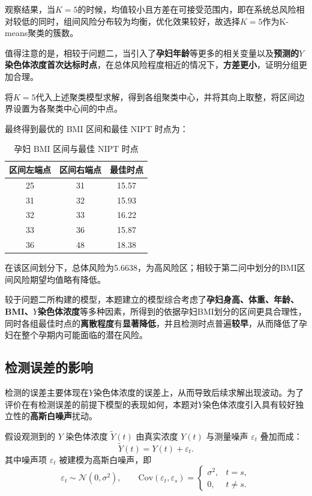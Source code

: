 \documentclass[12pt]{ctexart}
\begin{document}
	观察结果，当$K=5$的时候，均值较小且方差在可接受范围内，即在系统总风险相对较低的同时，组间风险分布较为均衡，优化效果较好，故选择$K=5$作为K-means聚类的簇数。
	
	值得注意的是，相较于问题二，当引入了\textbf{孕妇年龄}等更多的相关变量以及\textbf{预测的$Y$染色体浓度首次达标时点}，在总体风险程度相近的情况下，\textbf{方差更小}，证明分组更加合理。
	
	将$K=5$代入上述聚类模型求解，得到各组聚类中心，并将其向上取整，将区间边界设置为各聚类中心间的中点。
	
	最终得到最优的 BMI 区间和最佳 NIPT 时点为：
	\begin{table}[htbp]
		\centering
		\caption{孕妇 BMI 区间与最佳 NIPT 时点}
		\begin{threeparttable}
			\setlength{\tabcolsep}{14pt} %
			\begin{tabular}{ccc}
				\toprule
				区间左端点& 区间右端点& 最佳时点\\
				\midrule
				25 & 31 & 15.57 \\
				31 & 32 & 15.93 \\
				32 & 33 & 16.22 \\
				33 & 36 & 15.87 \\
				36 & 48 & 18.38 \\
				\bottomrule
			\end{tabular}
		\end{threeparttable}
	\end{table}
	
	在该区间划分下，总体风险为5.6638，为高风险区；相较于第二问中划分的BMI区间风险期望均值略有降低。
	
	较于问题二所构建的模型，本题建立的模型综合考虑了\textbf{孕妇身高、体重、年龄、BMI、$Y$染色体浓度}等多种因素，所得到的依据孕妇BMI划分的区间更具合理性，同时各组最佳时点的\textbf{离散程度}有\textbf{显著降低}，并且检测时点普遍\textbf{较早}，从而降低了孕妇在整个孕期内可能面临的潜在风险。
	
	\subsection{检测误差的影响}
	检测的误差主要体现在$Y$染色体浓度的误差上，从而导致后续求解出现波动。为了评价在有检测误差的前提下模型的表现如何，本题对$Y$染色体浓度引入具有较好独立性的\textbf{高斯白噪声}扰动。
	
	假设观测到的 $Y$ 染色体浓度 
	$\tilde{Y}(t)$ 由真实浓度 $Y(t)$ 与测量噪声 $\varepsilon_t$ 叠加而成：
	\begin{equation}
		\tilde{Y}(t) = Y(t) + \varepsilon_t.
	\end{equation}
	其中噪声项 $\varepsilon_t$ 被建模为高斯白噪声，即
	\begin{equation}
		\varepsilon_t \sim \mathcal{N}(0,\sigma^2), \qquad
		\mathrm{Cov}(\varepsilon_t,\varepsilon_s) = 
		\begin{cases}
			\sigma^2, & t=s, \\
			0, & t\neq s.
		\end{cases}
	\end{equation}
	
\end{document}
